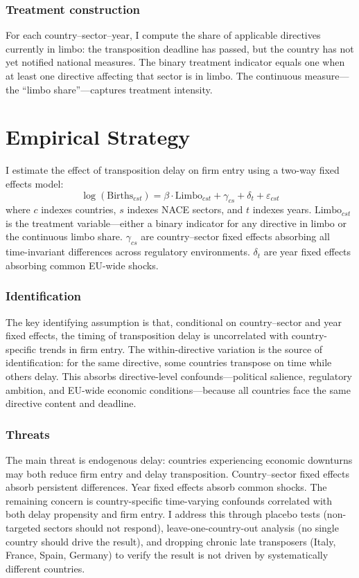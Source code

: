 \documentclass[12pt]{article}
\begin{document}
\subsubsection*{Treatment construction} For each country--sector--year, I compute the share of applicable directives currently in limbo: the transposition deadline has passed, but the country has not yet notified national measures. The binary treatment indicator equals one when at least one directive affecting that sector is in limbo. The continuous measure---the ``limbo share''---captures treatment intensity.






\section{Empirical Strategy}
\label{sec:strategy}

I estimate the effect of transposition delay on firm entry using a two-way fixed effects model:
\begin{equation}
\log(\text{Births}_{cst}) = \beta \cdot \text{Limbo}_{cst} + \gamma_{cs} + \delta_t + \varepsilon_{cst}
\label{eq:main}
\end{equation}
where $c$ indexes countries, $s$ indexes NACE sectors, and $t$ indexes years. $\text{Limbo}_{cst}$ is the treatment variable---either a binary indicator for any directive in limbo or the continuous limbo share. $\gamma_{cs}$ are country--sector fixed effects absorbing all time-invariant differences across regulatory environments. $\delta_t$ are year fixed effects absorbing common EU-wide shocks.

\subsubsection*{Identification} The key identifying assumption is that, conditional on country--sector and year fixed effects, the timing of transposition delay is uncorrelated with country-specific trends in firm entry. The within-directive variation is the source of identification: for the same directive, some countries transpose on time while others delay. This absorbs directive-level confounds---political salience, regulatory ambition, and EU-wide economic conditions---because all countries face the same directive content and deadline.

\subsubsection*{Threats} The main threat is endogenous delay: countries experiencing economic downturns may both reduce firm entry and delay transposition. Country--sector fixed effects absorb persistent differences. Year fixed effects absorb common shocks. The remaining concern is country-specific time-varying confounds correlated with both delay propensity and firm entry. I address this through placebo tests (non-targeted sectors should not respond), leave-one-country-out analysis (no single country should drive the result), and dropping chronic late transposers (Italy, France, Spain, Germany) to verify the result is not driven by systematically different countries.
\end{document}
